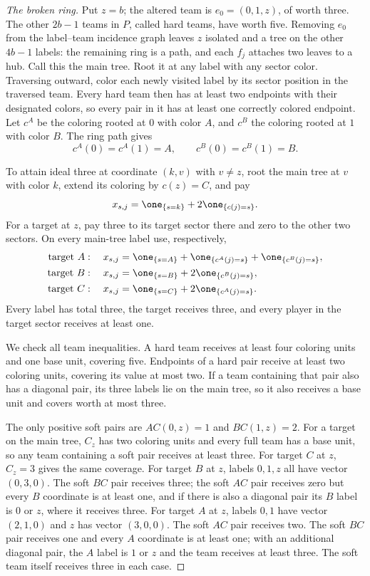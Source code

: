 \begin{proof}[The broken ring]
Put $z=b$; the altered team is $e_0=(0,1,z)$, of worth three.
The other $2b-1$ teams in $P$, called hard teams, have worth five.
Removing $e_0$ from the label--team incidence graph leaves $z$ isolated
and a tree on the other $4b-1$ labels: the remaining ring is a path,
and each $f_j$ attaches two leaves to a hub. Call this the main tree.
Root it at any label with any sector color. Traversing outward, color
each newly visited label by its sector position in the traversed team.
Every hard team then has at least two endpoints with their designated
colors, so every pair in it has at least one correctly colored endpoint.
Let $c^A$ be the coloring rooted at $0$ with color $A$, and $c^B$
the coloring rooted at $1$ with color $B$. The ring path gives
\[
                c^A(0)=c^A(1)=A,\qquad c^B(0)=c^B(1)=B.
\]

To attain ideal three at coordinate $(k,v)$ with $v\ne z$, root the
main tree at $v$ with color $k$, extend its coloring by $c(z)=C$,
and pay
\[
                        x_{s,j}=\one_{\{s=k\}}+2\one_{\{c(j)=s\}}.
\]
For a target at $z$, pay three to its target sector there and zero to
the other two sectors. On every main-tree label use, respectively,
\begin{align*}
 \text{target }A:\quad x_{s,j}&=\one_{\{s=A\}}
                         +\one_{\{c^A(j)=s\}}+\one_{\{c^B(j)=s\}},\\
 \text{target }B:\quad x_{s,j}&=\one_{\{s=B\}}+2\one_{\{c^B(j)=s\}},\\
 \text{target }C:\quad x_{s,j}&=\one_{\{s=C\}}+2\one_{\{c^A(j)=s\}}.
\end{align*}
Every label has total three, the target receives three, and every player
in the target sector receives at least one.

We check all team inequalities. A hard team receives at least four
coloring units and one base unit, covering five. Endpoints of a hard
pair receive at least two coloring units, covering its value at most
two. If a team containing that pair also has a diagonal pair, its three
labels lie on the main tree, so it also receives a base unit and covers
worth at most three.

The only positive soft pairs are $AC(0,z)=1$ and $BC(1,z)=2$.
For a target on the main tree, $C_z$ has two coloring units and every
full team has a base unit, so any team containing a soft pair receives
at least three. For target $C$ at $z$, $C_z=3$ gives the same coverage.
For target $B$ at $z$, labels $0,1,z$ all have vector $(0,3,0)$.
The soft $BC$ pair receives three; the soft $AC$ pair receives zero
but every $B$ coordinate is at least one, and if there is also a diagonal
pair its $B$ label is $0$ or $z$, where it receives three. For target
$A$ at $z$, labels $0,1$ have vector $(2,1,0)$ and $z$ has vector
$(3,0,0)$. The soft $AC$ pair receives two. The soft $BC$ pair
receives one and every $A$ coordinate is at least one; with an additional
diagonal pair, the $A$ label is $1$ or $z$ and the team receives at
least three. The soft team itself receives three in each case.


\end{proof}
